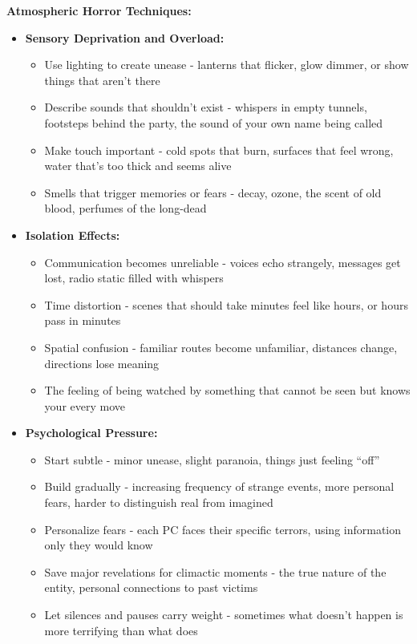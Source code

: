 \documentclass[11pt]{article}
\begin{document}
\textbf{Atmospheric Horror Techniques:}
\begin{itemize}
\item \textbf{Sensory Deprivation and Overload:}
  \begin{itemize}
  \item Use lighting to create unease - lanterns that flicker, glow dimmer, or show things that aren't there
  \item Describe sounds that shouldn't exist - whispers in empty tunnels, footsteps behind the party, the sound of your own name being called
  \item Make touch important - cold spots that burn, surfaces that feel wrong, water that's too thick and seems alive
  \item Smells that trigger memories or fears - decay, ozone, the scent of old blood, perfumes of the long-dead
  \end{itemize}
\item \textbf{Isolation Effects:}
  \begin{itemize}
  \item Communication becomes unreliable - voices echo strangely, messages get lost, radio static filled with whispers
  \item Time distortion - scenes that should take minutes feel like hours, or hours pass in minutes
  \item Spatial confusion - familiar routes become unfamiliar, distances change, directions lose meaning
  \item The feeling of being watched by something that cannot be seen but knows your every move
  \end{itemize}
\item \textbf{Psychological Pressure:}
  \begin{itemize}
  \item Start subtle - minor unease, slight paranoia, things just feeling ``off''
  \item Build gradually - increasing frequency of strange events, more personal fears, harder to distinguish real from imagined
  \item Personalize fears - each PC faces their specific terrors, using information only they would know
  \item Save major revelations for climactic moments - the true nature of the entity, personal connections to past victims
  \item Let silences and pauses carry weight - sometimes what doesn't happen is more terrifying than what does
  \end{itemize}
\end{itemize}
\end{document}
